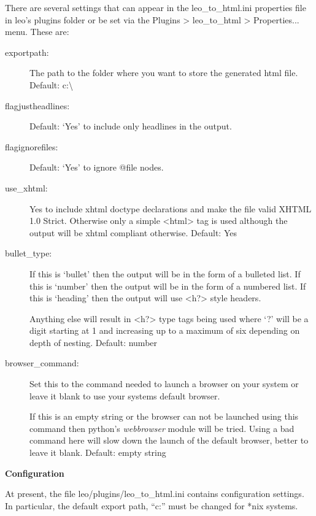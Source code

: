 \documentclass[a4paper,10pt,english]{sphinxmanual}
\begin{document}
There are several settings that can appear in the leo\_to\_html.ini properties
file in leo's plugins folder or be set via the Plugins \textgreater{} leo\_to\_html \textgreater{}
Properties... menu. These are:
\begin{description}
\item[{exportpath:}] \leavevmode
The path to the folder where you want to store the generated html file.
Default: c:\textbackslash{}

\item[{flagjustheadlines:}] \leavevmode
Default: `Yes' to include only headlines in the output.

\item[{flagignorefiles:}] \leavevmode
Default: `Yes' to ignore @file nodes.

\item[{use\_xhtml:}] \leavevmode
Yes to include xhtml doctype declarations and make the file valid XHTML 1.0 Strict.
Otherwise only a simple \textless{}html\textgreater{} tag is used although the output will be xhtml
compliant otherwise. Default: Yes

\item[{bullet\_type:}] \leavevmode
If this is `bullet' then the output will be in the form of a bulleted list.
If this is `number' then the output will be in the form of a numbered list.
If this is `heading' then the output will use \textless{}h?\textgreater{} style headers.

Anything else will result in \textless{}h?\textgreater{} type tags being used where `?' will be a
digit starting at 1 and increasing up to a maximum of six depending on depth
of nesting. Default: number

\item[{browser\_command:}] \leavevmode
Set this to the command needed to launch a browser on your system or leave it blank
to use your systems default browser.

If this is an empty string or the browser can not be launched using this command then
python's \emph{webbrowser} module will be tried. Using a bad command here will slow down the
launch of the default browser, better to leave it blank.
Default: empty string

\end{description}

\textbf{Configuration}

At present, the file leo/plugins/leo\_to\_html.ini contains configuration
settings. In particular, the default export path, ``c:'' must be changed for *nix
systems.
\end{document}
